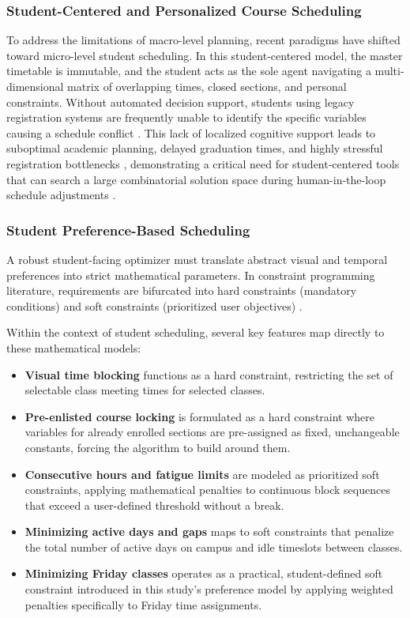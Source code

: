 \documentclass{icsthesis}
\begin{document}
\begin{mainmatter}
		\subsubsection{Student-Centered and Personalized Course Scheduling}
		To address the limitations of macro-level planning, recent paradigms have shifted toward micro-level student scheduling. In this student-centered model, the master timetable is immutable, and the student acts as the sole agent navigating a multi-dimensional matrix of overlapping times, closed sections, and personal constraints. Without automated decision support, students using legacy registration systems are frequently unable to identify the specific variables causing a schedule conflict \citep{vasileiou2025}. This lack of localized cognitive support leads to suboptimal academic planning, delayed graduation times, and highly stressful registration bottlenecks \citep{hermocilla2022}, demonstrating a critical need for student-centered tools that can search a large combinatorial solution space during human-in-the-loop schedule adjustments \citep{vasileiou2025}.
		
		\subsubsection{Student Preference-Based Scheduling}
		A robust student-facing optimizer must translate abstract visual and temporal preferences into strict mathematical parameters. In constraint programming literature, requirements are bifurcated into hard constraints (mandatory conditions) and soft constraints (prioritized user objectives) \citep{meier2026}.
		
		Within the context of student scheduling, several key features map directly to these mathematical models:
		\begin{itemize}
			\item \textbf{Visual time blocking} functions as a hard constraint, restricting the set of selectable class meeting times for selected classes.
			\item \textbf{Pre-enlisted course locking} is formulated as a hard constraint where variables for already enrolled sections are pre-assigned as fixed, unchangeable constants, forcing the algorithm to build around them.
			\item \textbf{Consecutive hours and fatigue limits} are modeled as prioritized soft constraints, applying mathematical penalties to continuous block sequences that exceed a user-defined threshold without a break.
			\item \textbf{Minimizing active days and gaps} maps to soft constraints that penalize the total number of active days on campus and idle timeslots between classes.
			\item \textbf{Minimizing Friday classes} operates as a practical, student-defined soft constraint introduced in this study's preference model by applying weighted penalties specifically to Friday time assignments.
		\end{itemize}
		

\end{mainmatter}
\end{document}
